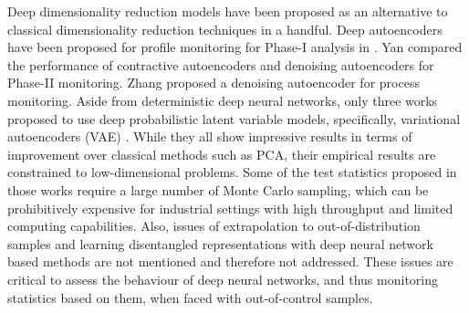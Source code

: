 \documentclass{scrartcl}
\theoremstyle{definition}
\begin{document}
Deep dimensionality reduction models have been proposed as an alternative to classical dimensionality reduction techniques in a handful.
Deep autoencoders have been proposed for profile monitoring for Phase-I analysis in \parencite{Howard2018-op}. 
Yan \etal \parencite{Yan2016-wa} compared the performance of contractive autoencoders and denoising autoencoders for Phase-II monitoring. 
Zhang \etal \parencite{Zhang2018-js} proposed a denoising autoencoder for process monitoring.
Aside from deterministic deep neural networks, only three works \parencite{wang2019systematic,Zhang2019-lu,lee2019process} proposed to use deep probabilistic latent variable models, specifically, variational autoencoders (VAE) \parencite{Kingma2013-dl}.
While they all show impressive results in terms of improvement over classical methods such as PCA, their empirical results are constrained to low-dimensional problems.
Some of the test statistics proposed in those works require a large number of Monte Carlo sampling, which can be prohibitively expensive for industrial settings with high throughput and limited computing capabilities.
Also, issues of extrapolation to out-of-distribution samples and learning disentangled representations with deep neural network based methods are not mentioned and therefore not addressed.
These issues are critical to assess the behaviour of deep neural networks, and thus monitoring statistics based on them, when faced with out-of-control samples.
\end{document}
